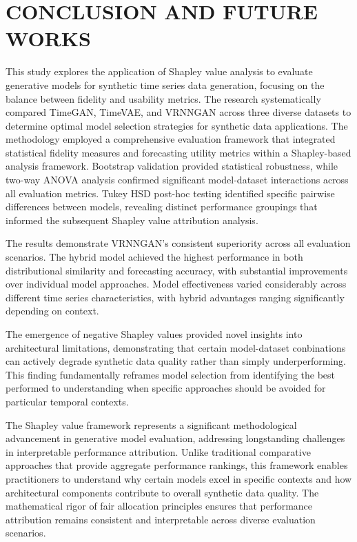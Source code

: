 \documentclass[11pt]{article}
\begin{document}
\newpage
\section{CONCLUSION AND FUTURE WORKS}
This study explores the application of Shapley value analysis to evaluate generative models for synthetic time series data generation, focusing on the balance between fidelity and usability metrics. The research systematically compared TimeGAN, TimeVAE, and VRNNGAN across three diverse datasets to determine optimal model selection strategies for synthetic data applications. The methodology employed a comprehensive evaluation framework that integrated statistical fidelity measures and forecasting utility metrics within a Shapley-based analysis framework. Bootstrap validation provided statistical robustness, while two-way ANOVA analysis confirmed significant model-dataset interactions across all evaluation metrics. Tukey HSD post-hoc testing identified specific pairwise differences between models, revealing distinct performance groupings that informed the subsequent Shapley value attribution analysis.

The results demonstrate VRNNGAN's consistent superiority across all evaluation scenarios. The hybrid model achieved the highest performance in both distributional similarity and forecasting accuracy, with substantial improvements over individual model approaches. Model effectiveness varied considerably across different time series characteristics, with hybrid advantages ranging significantly depending on context. 

The emergence of negative Shapley values provided novel insights into architectural limitations, demonstrating that certain model-dataset conbinations can actively degrade synthetic data quality rather than simply underperforming. This finding fundamentally reframes model selection from identifying the best performed to understanding when specific approaches should be avoided for particular temporal contexts.

The Shapley value framework represents a significant methodological advancement in generative model evaluation, addressing longstanding challenges in interpretable performance attribution. Unlike traditional comparative approaches that provide aggregate performance rankings, this framework enables practitioners to understand why certain models excel in specific contexts and how architectural components contribute to overall synthetic data quality. The mathematical rigor of fair allocation principles ensures that performance attribution remains consistent and interpretable across diverse evaluation scenarios.
\end{document}
